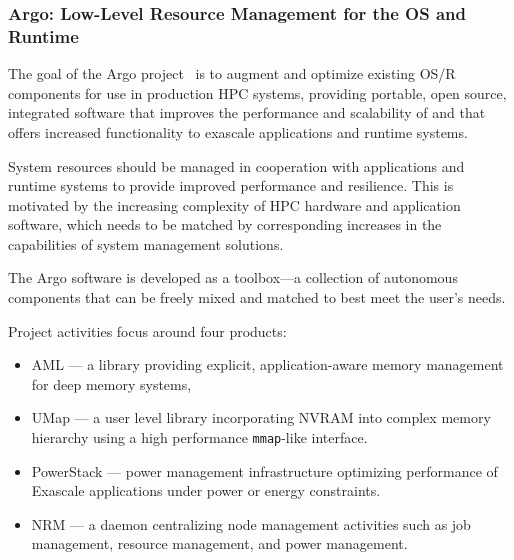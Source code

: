 \subsubsection{ Argo: Low-Level Resource Management for the OS and Runtime}

The goal of the Argo project~\cite{perarnau2017argo} is to augment and
optimize existing OS/R components for use in production HPC systems,
providing portable, open source, integrated software that improves the
performance and scalability of and that offers increased functionality to
exascale applications and runtime systems.

System resources should be managed in cooperation with applications and
runtime systems to provide improved performance and resilience. This is
motivated by the increasing complexity of HPC hardware and application
software, which needs to be matched by corresponding increases in the
capabilities of system management solutions.

The Argo software is developed as a toolbox---a collection of autonomous
components that can be freely mixed and matched to best meet the user's
needs.

Project activities focus around four products:
\begin{itemize}
\item AML --- a library providing explicit, application-aware memory
management for deep memory systems,

\item UMap --- a user level library incorporating NVRAM into complex memory
hierarchy using a high performance \texttt{mmap}-like interface.

\item PowerStack --- power management infrastructure optimizing performance
of Exascale applications under power or energy constraints.

\item NRM --- a daemon centralizing node management activities such as
job management, resource management, and power management.
\end{itemize}





